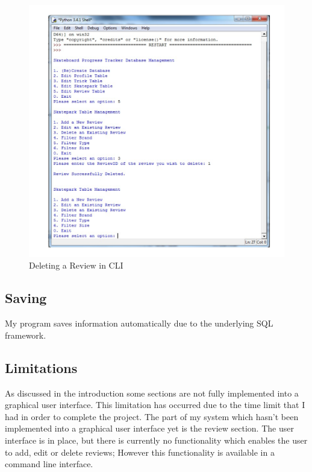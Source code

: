 \begin{figure}[H]
    \includegraphics[width=\textwidth]{./Manual/Images/DeleteReview.pdf}
    \caption{Deleting a Review in CLI} \label{fig:Delete Review}
\end{figure}


\subsection{Saving}

My program saves information automatically due to the underlying SQL framework.

\subsection{Limitations} %

As discussed in the introduction some sections are not fully implemented into a graphical user interface. This limitation has occurred due to the time limit that I had in order to complete the project. The part of my system which hasn't been implemented into a graphical user interface yet is the review section. The user interface is in place, but there is currently no functionality which enables the user to add, edit or delete reviews; However this functionality is available in a command line interface.

